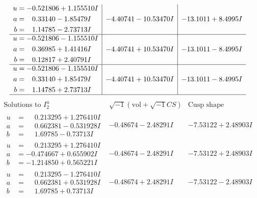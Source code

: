\documentclass[1p]{elsarticle_modified}
\theoremstyle{definition}
\newcommand{\I}{\sqrt{-1}}
\begin{document}
$$\begin{array}{c|c|c}
\begin{aligned}
u &= -0.521806 + 1.155510 I \\
a &= \phantom{-}0.33140 - 1.85479 I \\
b &= \phantom{-}1.14785 - 2.73713 I\end{aligned}
 & -4.40741 - 10.53470 I & -13.1011 + 8.4995 I \\ \hline\begin{aligned}
u &= -0.521806 - 1.155510 I \\
a &= \phantom{-}0.36985 + 1.41416 I \\
b &= \phantom{-}0.12817 + 2.40791 I\end{aligned}
 & -4.40741 + 10.53470 I & -13.1011 - 8.4995 I \\ \hline\begin{aligned}
u &= -0.521806 - 1.155510 I \\
a &= \phantom{-}0.33140 + 1.85479 I \\
b &= \phantom{-}1.14785 + 2.73713 I\end{aligned}
 & -4.40741 + 10.53470 I & -13.1011 - 8.4995 I\\
 \hline 
 \end{array}$$\newpage$$\begin{array}{c|c|c}  
\text{Solutions to }I^u_{2}& \I (\text{vol} + \sqrt{-1}CS) & \text{Cusp shape}\\
 \hline 
\begin{aligned}
u &= \phantom{-}0.213295 + 1.276410 I \\
a &= \phantom{-}0.662381 - 0.531928 I \\
b &= \phantom{-}1.69785 - 0.73713 I\end{aligned}
 & -0.48674 - 2.48291 I & -7.53122 + 2.48903 I \\ \hline\begin{aligned}
u &= \phantom{-}0.213295 + 1.276410 I \\
a &= -0.474667 + 0.655902 I \\
b &= -1.214850 + 0.565221 I\end{aligned}
 & -0.48674 - 2.48291 I & -7.53122 + 2.48903 I \\ \hline\begin{aligned}
u &= \phantom{-}0.213295 - 1.276410 I \\
a &= \phantom{-}0.662381 + 0.531928 I \\
b &= \phantom{-}1.69785 + 0.73713 I\end{aligned}
 & -0.48674 + 2.48291 I & -7.53122 - 2.48903 I \\ \hline\begin{aligned}

\end{aligned}
\end{array}$$
\end{document}
